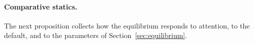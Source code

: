 \paragraph{Comparative statics.}
The next proposition collects how the equilibrium responds to attention, to the default, and to the parameters of Section~\ref{sec:equilibrium}.
